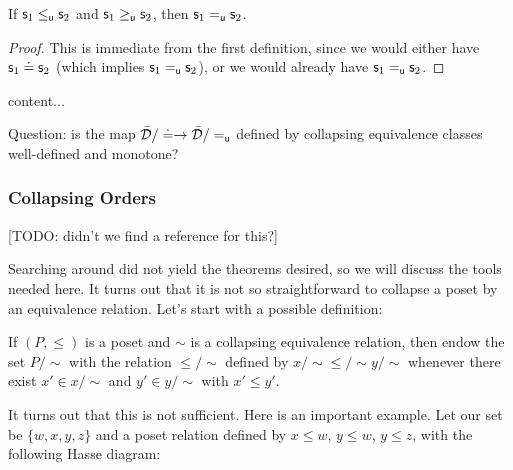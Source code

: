 \documentclass[10pt, onecolumn, nofootinbib]{revtex4-1}
\begin{document}
\begin{prop}
	If $\mathsf{s}_1\leq_{\mathsf{u}}\mathsf{s}_2$ and $\mathsf{s}_1\geq_{\mathsf{u}} \mathsf{s}_2$, then $\mathsf{s}_1=_{\mathsf{u}}\mathsf{s}_2$.
\end{prop}
\begin{proof}
	This is immediate from the first definition, since we would either have $\mathsf{s}_1\doteq\mathsf{s}_2$ (which implies $\mathsf{s}_1=_{\mathsf{u}}\mathsf{s}_2$), or we would already have $\mathsf{s}_1=_{\mathsf{u}}\mathsf{s}_2$.
\end{proof}

\begin{remark}
	content...
\end{remark}

Question: is the map $\bar{\mathcal{D}} / \doteq \to \bar{\mathcal{D}} / =_{\mathsf{u}}$ defined by collapsing equivalence classes well-defined and monotone? 


\subsubsection{Collapsing Orders}
[TODO: didn't we find a reference for this?]

Searching around did not yield the theorems desired, so we will discuss the tools needed here. It turns out that it is not so straightforward to collapse a poset by an equivalence relation. Let's start with a possible definition: 

If $(P,\leq)$ is a poset and $\sim$ is a collapsing equivalence relation, then endow the set $P/\sim$ with the relation $\leq/\sim$ defined by $x/\sim \leq/\sim y/\sim$ whenever there exist $x'\in x/\sim$ and $y'\in y/\sim$ with $x'\leq y'$. 

It turns out that this is not sufficient. Here is an important example. Let our set be $\{w,x,y,z\}$ and a poset relation defined by $x\leq w$, $y\leq w$, $y\leq z$, with the following Hasse diagram:

\end{document}
